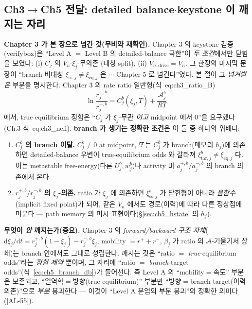 \documentclass[11pt,a4paper]{article}
\newcommand{\dd}{\mathrm{d}}
\newcommand{\eq}{\mathrm{eq}}
\newcommand{\drive}{\mathrm{drive}}
\newcommand{\tar}{\mathrm{tar}}
\newcommand{\sstat}{\mathrm{ss}}
\newcommand{\AL}[1]{\textsf{[AL-#1]}}
\begin{document}
\subsection{Ch3$\to$Ch5 전달: detailed balance$\cdot$keystone 이 깨지는 자리}\label{sec:ch5_dbbreak}
\textbf{Chapter 3 가 본 장으로 넘긴 것(무비약 재확인).} Chapter 3 의 keystone 검증(verifybox)은 ``Level A $=$
Level B 의 detailed-balance 극한''이 \emph{두 조건}에서만 닫힘을 보였다: (i) $C_j$ 의 $V_n$$\cdot$$\xi_j$-무의존
(대칭 split), (ii) $V_{n,\drive}=V_n$. 그 한정의 마지막 문장이 ``branch 비대칭 $\xi_{\sstat,j}\ne\xi_{\eq,j}$
은 $\cdots$ Chapter 5 로 넘긴다''였다. 본 절이 그 \emph{넘겨받은} 부분을 명시한다. Chapter 3 의 rate ratio
일반형(식~eq:ch3\_ratio\_B)
\begin{equation}
\ln\frac{r_j^{+,b}}{r_j^{-,b}}=C_j^b(\xi_j,T)+\frac{\mathcal A_j^b}{RT}
\label{eq:ch5_ratio_branch}
\end{equation}
에서, true equilibrium 정합은 ``$C_j$ 가 $\xi_j$-무관 \emph{이고} midpoint 에서 0''을 요구했다(Ch.3
식~eq:ch3\_neff). \textbf{branch 가 생기는 정확한 조건}은 이 둘 중 하나의 위배다:
\begin{enumerate}[label=(\alph*),leftmargin=2.2em]
\item \textbf{$C_j^b$ 의 branch 이탈.} $C_j^b\ne0$ at midpoint, 또는 $C_j^b$ 가 branch(메모리 $h_j$)에 의존하면
  detailed-balance 우변이 true-equilibrium odds 와 갈라져 $\xi_{\tar,j}^b\ne\xi_{\eq,j}$ 다. 이는 metastable
  free-energy(다른 $U_j^b,w_j^b$)나 activity 비 $a_j^{+,b}/a_j^{-,b}$ 의 branch 의존에서 온다.
\item \textbf{$r_j^{+,b}/r_j^{-,b}$ 의 $\xi_j$-의존.} ratio 가 $\xi_j$ 에 의존하면 $\xi_{\sstat,j}^b$ 가
  닫힌형이 아니라 \emph{음함수}(implicit fixed point)가 되어, 같은 $V_n$ 에서도 경로(이력)에 따라 다른 정상점에
  머문다 — path memory 의 미시 표현이다(\S\ref{sec:ch5_hstate} 의 $h_j$).
\end{enumerate}
\textbf{무엇이 \emph{안} 깨지는가(중요).} Chapter 3 의 \emph{forward/backward 구조 자체}($\dd\xi_j/\dd t=
r_j^{+,b}(1-\xi_j)-r_j^{-,b}\xi_j$, mobility $=r^++r^-$, $\beta_j$ 가 ratio 의 $\mathcal A$-기울기서 상쇄)는
branch 안에서도 그대로 성립한다. 깨지는 것은 ``ratio $=$ \emph{true}-equilibrium odds''라는 \emph{정합 제약}
뿐이며, 그 자리에 ``ratio $=$ \emph{branch}-target odds''(식~\eqref{eq:ch5_branch_db})가 들어선다. 즉 Level A
의 ``mobility$=$속도'' 부분은 보존되고, ``열역학$=$방향(true equilibrium)'' 부분만 ``방향$=$branch target(이력
의존)''으로 \emph{부분} 붕괴한다 — 이것이 ``Level A 분업의 부분 붕괴''의 정확한 의미다(\AL{55}).
\end{document}
